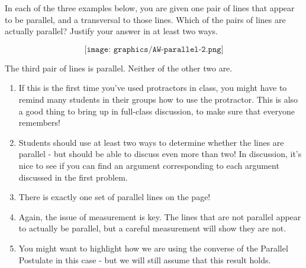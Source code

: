 \documentclass{ximera}
\begin{document}
\newpage
\begin{problem}

In each of the three examples below, you are given one pair of lines that appear to be parallel, and a transversal to those lines.  Which of the pairs of lines are actually parallel?  Justify your answer in at least two ways.

\[
\texttt{[image: graphics/AW-parallel-2.png]}
\]

\begin{solution}
    The third pair of lines is parallel.  Neither of the other two are.
\end{solution}

\begin{instructorNotes}
\begin{enumerate}
\item If this is the first time you've used protractors in class, you might have to remind many students in their groups how to use the protractor.  This is also a good thing to bring up in full-class discussion, to make sure that everyone remembers!
\item Students should use at least two ways to determine whether the lines are parallel - but should be able to discuss even more than two!  In discussion, it's nice to see if you can find an argument corresponding to each argument discussed in the first problem.  
\item There is exactly one set of parallel lines on the page!
\item Again, the issue of measurement is key.  The lines that are not parallel appear to actually be parallel, but a careful measurement will show they are not.
\item You might want to highlight how we are using the converse of the Parallel Postulate in this case - but we will still assume that this result holds.
\end{enumerate}
\end{instructorNotes}
\end{problem}
\end{document}

